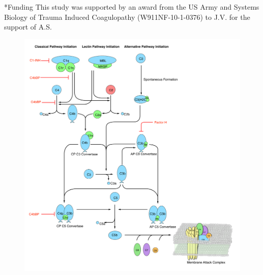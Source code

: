 \documentclass[12pt]{article}
\makeatletter
\renewcommand\section{\@startsection
	{subsection}{2}{0mm}
	{-0.2in}
	{0.05\baselineskip}
	{\normalfont\large\bfseries}}
\makeatother
\begin{document}
\section*{Funding}
This study was supported by an award from the US Army and Systems Biology of Trauma Induced Coagulopathy (W911NF-10-1-0376) to J.V. for the support of A.S.

\clearpage




\clearpage


\begin{figure}[h]
\centering
\includegraphics[width=1.0\textwidth]{./figs/Fig1_Schematic_v2.pdf}

\end{figure}
\end{document}
